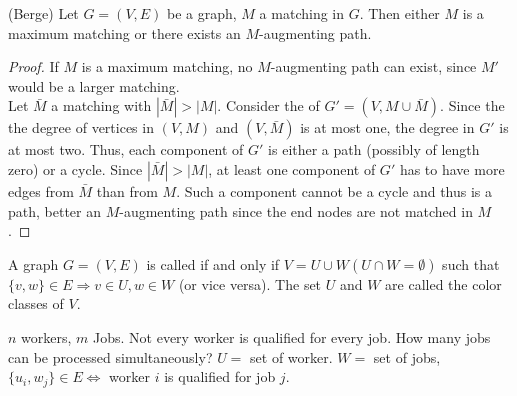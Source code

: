 \begin{lec}[2011-11-04]\end{lec}


\begin{thm}(Berge) Let $G=(V,E)$ be a graph, $M$ a matching in $G$. Then either $M$ is a maximum matching or there exists an $M$-augmenting path.
\end{thm}
\begin{proof}
If $M$ is a maximum matching, no $M$-augmenting path can exist, since $M'$ would be a larger matching. \\
Let $\bar{M}$ a matching with $|\bar M | > | M |$. Consider the  of $G'=(V,M \cup \bar M)$. Since the the degree of vertices in $(V,M)$ and $(V,\bar M)$ is at most one, the degree in $G'$ is at most two. Thus, each component of $G'$ is either a path (possibly of length zero) or a cycle. Since $|\bar M| > |M|$, at least one component of $G'$ has to have more edges from $\bar M$ than from $M$. Such a component cannot be a cycle and thus is a path, better an $M$-augmenting path since the end nodes are not matched in $M$.
\end{proof}

\begin{defn} 
A graph $ G=(V,E) $ is called  if and only if $V=U \cup W (U\cap W =\emptyset)$ such that $\{v,w\} \in E \Rightarrow v \in U, w \in W$ (or vice versa). The set $U$ and $W$ are called the color classes of $V$.
\end{defn}

\begin{xmp+}
$n$ workers, $m$ Jobs. Not every worker is qualified for every job. How many jobs can be processed simultaneously? $U=$ set of worker. $W=$ set of jobs, $\{u_i,w_j\} \in E \Leftrightarrow$ worker $i$ is qualified for job $j$.
\end{xmp+}


